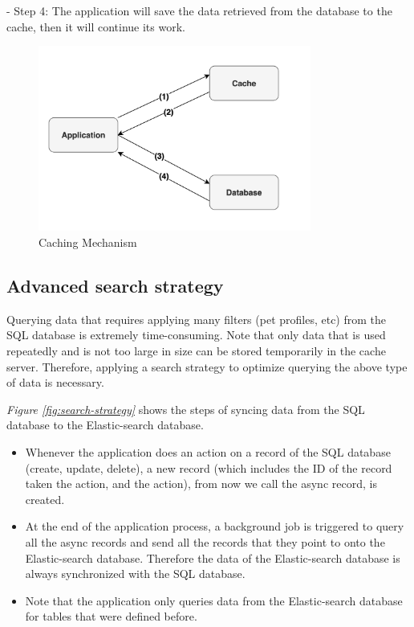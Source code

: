 - Step 4: The application will save the data retrieved from the database
to the cache, then it will continue its work.

\begin{figure}[H]
    \centering
    \includegraphics[width=0.8\textwidth]{Figures/caching_strat.png}
    \caption{Caching Mechanism}
    \label{fig:caching}
\end{figure}

\subsection{Advanced search strategy}

Querying data that requires applying many filters (pet profiles, etc)
from the SQL database is extremely time-consuming. Note that only data
that is used repeatedly and is not too large in size can be stored
temporarily in the cache server. Therefore, applying a search strategy
to optimize querying the above type of data is necessary.

\emph{Figure \ref{fig:search-strategy}} shows the steps of syncing data from the SQL database
to the Elastic-search database.

\begin{itemize}
    \item
          Whenever the application does an action on a record of the SQL
          database (create, update, delete), a new record (which includes the ID
          of the record taken the action, and the action), from now we call the
          async record, is created.
    \item
          At the end of the application process, a background job is triggered
          to query all the async records and send all the records that they
          point to onto the Elastic-search database. Therefore the data of the
          Elastic-search database is always synchronized with the SQL database.
    \item
          Note that the application only queries data from the Elastic-search
          database for tables that were defined before.
\end{itemize}

